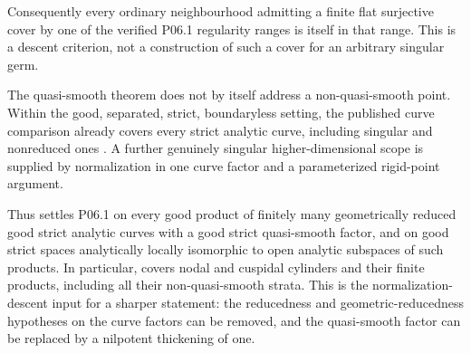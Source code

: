 Consequently every ordinary neighbourhood admitting a finite flat surjective
cover by one of the verified P06.1 regularity ranges is itself in that
range.  This is a descent criterion, not a construction of such a cover for
an arbitrary singular germ.

The quasi-smooth theorem does not by itself address a non-quasi-smooth
point. Within the good, separated, strict, boundaryless setting, the
published curve comparison already
covers every strict analytic curve, including singular and nonreduced ones
\cite[\S4.1.2 and Proposition~3.15]{GR25Classical}.  A further genuinely
singular higher-dimensional scope is supplied by normalization in one curve
factor and a parameterized rigid-point argument.


\begingroup
\makeatletter
\let\pzeroonesix@original@nonumberplain\th@nonumberplain
\def\th@nonumberplain{%
  \pzeroonesix@original@nonumberplain
  \def\@opargbegintheorem##1##2##3{%
    \item[\theorem@headerfont\hskip\labelsep ##3\theorem@separator]}}
\makeatother

\endgroup

Thus  settles P06.1 on every good product
of finitely many geometrically reduced good strict analytic curves with a
good strict quasi-smooth factor, and on good strict spaces analytically
locally isomorphic to open analytic subspaces of such products.  In
particular,  covers nodal and cuspidal
cylinders and their finite products, including all their non-quasi-smooth
strata.  This is the normalization-descent input for a sharper statement:
the reducedness and geometric-reducedness hypotheses on the curve factors
can be removed, and the quasi-smooth factor can be replaced by a nilpotent
thickening of one.


\begingroup
\makeatletter
\let\pzeroonesixarbitrary@original@nonumberplain\th@nonumberplain
\def\th@nonumberplain{%
  \pzeroonesixarbitrary@original@nonumberplain
  \def\@opargbegintheorem##1##2##3{%
    \item[\theorem@headerfont\hskip\labelsep ##3\theorem@separator]}}
\makeatother

\endgroup

